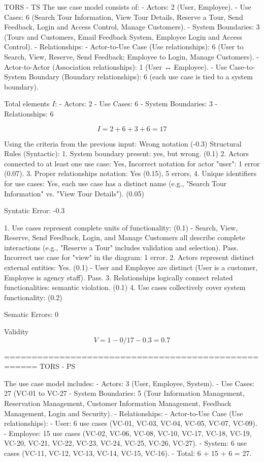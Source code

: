TORS - TS
The use case model consists of:
- Actors: 2 (User, Employee).
- Use Cases: 6 (Search Tour Information, View Tour Details, Reserve a Tour, Send Feedback, Login and Access Control, Manage Customers).
- System Boundaries: 3 (Tours and Customers, Email Feedback System, Employee Login and Access Control).
- Relationships: 
- Actor-to-Use Case (Use relationships): 6 (User to Search, View, Reserve, Send Feedback; Employee to Login, Manage Customers).
- Actor-to-Actor (Association relationships): 1 (User ↔ Employee).
- Use Case-to-System Boundary (Boundary relationships): 6 (each use case is tied to a system boundary).

Total elements \( I \):
- Actors: 2
- Use Cases: 6
- System Boundaries: 3
- Relationships: 6 

\[
I = 2 + 6 + 3 + 6 = 17
\]

Using the criteria from the previous input: Wrong notation (-0.3)
Structural Rules (Syntactic):
1. System boundary present: yes,  but wrong. (0.1)
2. Actors connected to at least one use case: Yes, Incorrect notation for actor "user": 1 error (0.07).
3. Proper relationships notation: Yes (0.15), 5 errors, 
4. Unique identifiers for use cases: Yes, each use case has a distinct name (e.g., "Search Tour Information" vs. "View Tour Details").  (0.05)

Syntatic Error: -0.3

1. Use cases represent complete units of functionality: (0.1)
- Search, View, Reserve, Send Feedback, Login, and Manage Customers all describe complete interactions (e.g., "Reserve a Tour" includes validation and selection). Pass. Incorrect use case for "view" in the diagram: 1 error.
2. Actors represent distinct external entities: Yes. (0.1)
- User and Employee are distinct (User is a customer, Employee is agency staff). Pass. 
3. Relationships logically connect related functionalities: semantic violation.  (0.1)
4. Use cases collectively cover system functionality: (0.2)

Sematic Errors: 0 

Validity
\[
V = 1 - 0/17 -0.3= 0.7
\]

====================================================
TORS - PS

The use case model includes: 
- Actors: 3 (User, Employee, System).
- Use Cases: 27 (VC-01 to VC-27
- System Boundaries: 5 	(Tour Information Management, Reservation Management, Customer Information Management, Feedback Management, Login and Security).
- Relationships:
- Actor-to-Use Case (Use relationships): 
- User: 6 use cases (VC-01, VC-03, VC-04, VC-05, VC-07, VC-09).
- Employee: 15 use cases (VC-02, VC-06, VC-08, VC-10, VC-17, VC-18, VC-19, VC-20, VC-21, VC-22, VC-23, VC-24, VC-25, VC-26, VC-27).
- System: 6 use cases (VC-11, VC-12, VC-13, VC-14, VC-15, VC-16).
- Total: 6 + 15 + 6 = 27.

